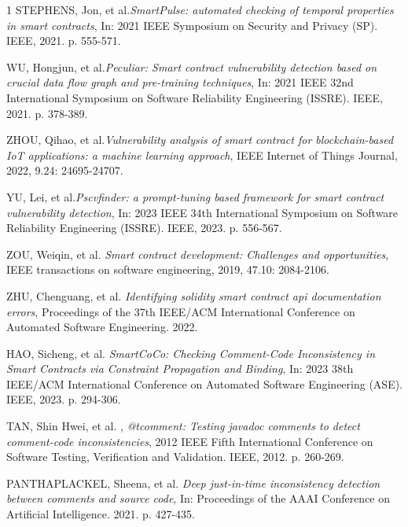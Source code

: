\documentclass[10pt, conference]{IEEEtran}
\begin{document}
\begin{thebibliography}{1}
    STEPHENS, Jon, et al.\emph{SmartPulse: automated checking of temporal properties in smart contracts}, In: 2021 IEEE Symposium on Security and Privacy (SP). IEEE, 2021. p. 555-571.    

    WU, Hongjun, et al.\emph{Peculiar: Smart contract vulnerability detection based on crucial data flow graph and pre-training techniques}, In: 2021 IEEE 32nd International Symposium on Software Reliability Engineering (ISSRE). IEEE, 2021. p. 378-389.

    ZHOU, Qihao, et al.\emph{Vulnerability analysis of smart contract for blockchain-based IoT applications: a machine learning approach}, IEEE Internet of Things Journal, 2022, 9.24: 24695-24707. 
    
    YU, Lei, et al.\emph{Pscvfinder: a prompt-tuning based framework for smart contract vulnerability detection}, In: 2023 IEEE 34th International Symposium on Software Reliability Engineering (ISSRE). IEEE, 2023. p. 556-567. 

     ZOU, Weiqin, et al. \emph{Smart contract development: Challenges and opportunities}, IEEE transactions on software engineering, 2019, 47.10: 2084-2106.



     ZHU, Chenguang, et al. \emph{Identifying solidity smart contract api documentation errors}, Proceedings of the 37th IEEE/ACM International Conference on Automated Software Engineering. 2022.

    HAO, Sicheng, et al. \emph{SmartCoCo: Checking Comment-Code Inconsistency in Smart Contracts via Constraint Propagation and Binding}, In: 2023 38th IEEE/ACM International Conference on Automated Software Engineering (ASE). IEEE, 2023. p. 294-306.

     TAN, Shin Hwei, et al. , \emph{@tcomment: Testing javadoc comments to detect comment-code inconsistencies}, 2012 IEEE Fifth International Conference on Software Testing, Verification and Validation. IEEE, 2012. p. 260-269.

     PANTHAPLACKEL, Sheena, et al. \emph{Deep just-in-time inconsistency detection between comments and source code}, In: Proceedings of the AAAI Conference on Artificial Intelligence. 2021. p. 427-435.
\end{thebibliography}
\end{document}
